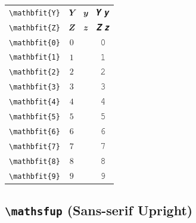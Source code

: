 \documentclass[12pt,a4paper]{article}
\begin{document}
\begin{longtable}{|c|c|c|c|}
\verb|\mathbfit{Y}| & $\mathbfit{Y}$ & $\mathbfit{y}$ & 𝒀 𝒚 \\
\verb|\mathbfit{Z}| & $\mathbfit{Z}$ & $\mathbfit{z}$ & 𝒁 𝒛 \\
\verb|\mathbfit{0}| & $\mathbfit{0}$ & & 𝟶 \\
\verb|\mathbfit{1}| & $\mathbfit{1}$ & & 𝟷 \\
\verb|\mathbfit{2}| & $\mathbfit{2}$ & & 𝟸 \\
\verb|\mathbfit{3}| & $\mathbfit{3}$ & & 𝟹 \\
\verb|\mathbfit{4}| & $\mathbfit{4}$ & & 𝟺 \\
\verb|\mathbfit{5}| & $\mathbfit{5}$ & & 𝟻 \\
\verb|\mathbfit{6}| & $\mathbfit{6}$ & & 𝟼 \\
\verb|\mathbfit{7}| & $\mathbfit{7}$ & & 𝟽 \\
\verb|\mathbfit{8}| & $\mathbfit{8}$ & & 𝟾 \\
\verb|\mathbfit{9}| & $\mathbfit{9}$ & & 𝟿 \\
\hline
\end{longtable}

\newpage

\subsection*{\texttt{\textbackslash{}mathsfup} (Sans-serif Upright)}
\end{document}
